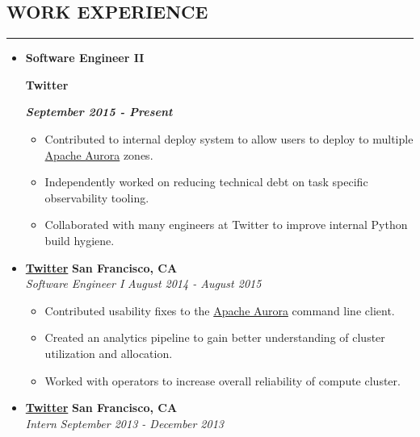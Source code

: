 \documentclass[10pt,letterpaper]{article}
\newcommand\textbox[1]{%
  \parbox{.333\textwidth}{#1}%
}
\begin{document}
  \subsection*{WORK EXPERIENCE}
  \hrule
  \vspace{0.5em}
  \begin{itemize}[leftmargin=*]
    \parskip=-0.6em
    
    \item[]
    {
      \textbox{\textbf{Software Engineer II}\hfill}\textbox{\hfil \textbf{Twitter}\hfil}\hfill \textbf{\emph{September 2015 - Present}}
    }
    
    \begin{itemize}[label=\textbullet]
      \itemsep0em
      \item Contributed to internal deploy system to allow users to deploy to
      multiple \href{aurora.apache.org}{Apache Aurora} zones.
      \item Independently worked on reducing technical debt on task specific
      observability tooling.
      \item Collaborated with many engineers at Twitter to improve internal
      Python build hygiene.
    \end{itemize}
    
    
    \item[]
    {\href{http://www.twitter.com}{\textbf{Twitter}} \hfill
      \textbf{San Francisco, CA}}
    \\
    {\emph{Software Engineer I} \hfill \emph{August 2014 - August 2015}}
    
    \begin{itemize}[label=\textbullet]
      \itemsep0em
      \item Contributed usability fixes to the
      \href{aurora.apache.org}{Apache Aurora} command line client.
      \item Created an analytics pipeline to gain better understanding of
      cluster utilization and allocation.
      \item Worked with operators to increase overall reliability of compute
      cluster.
    \end{itemize}
    
    \item[]
    {\href{http://www.twitter.com}{\textbf{Twitter}} \hfill
      \textbf{San Francisco, CA}}
    \\
    {\emph{Intern} \hfill \emph{September 2013 - December 2013}}
    

\end{itemize}
\end{document}
